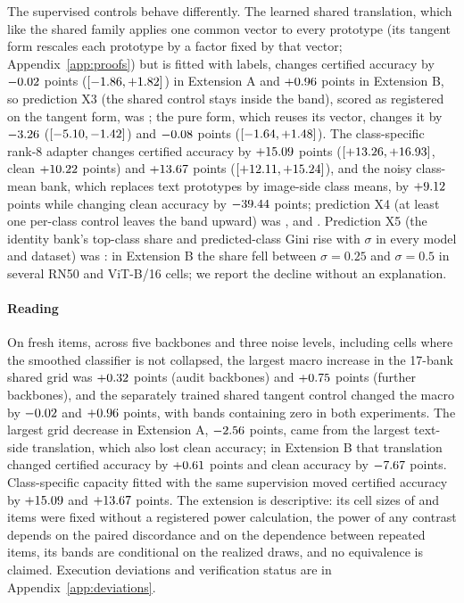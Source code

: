 The supervised controls behave differently. The learned shared translation,
which like the shared family applies one common vector to every prototype
(its tangent form rescales each prototype by a factor fixed by that vector;
Appendix~\ref{app:proofs}) but is fitted with labels, changes certified
accuracy by $-0.02$ points
($[-1.86,+1.82]$) in Extension A and
$+0.96$ points in Extension B, so prediction X3 (the shared
control stays inside the band), scored as registered on the tangent form, was
\ExtXthreeSummary{}; the pure form, which reuses its vector, changes it by $-3.26$
($[-5.10,-1.42]$) and $-0.08$
points ($[-1.64,+1.48]$). The
class-specific rank-8 adapter changes certified accuracy by
$+15.09$ points ($[+13.26,+16.93]$, clean
$+10.22$ points) and $+13.67$ points
($[+12.11,+15.24]$), and the noisy class-mean bank,
which replaces text prototypes by image-side class means, by
$+9.12$ points while changing clean accuracy by
$-39.44$ points; prediction X4 (at least one per-class
control leaves the band upward) was \ExtXfourSummary{}, and \ExtXfourFlags{}.
Prediction X5 (the identity bank's
top-class share and predicted-class Gini rise with $\sigma$ in every model and
dataset) was \ExtXfiveSummary{}: in Extension B the share fell between
$\sigma=0.25$ and $\sigma=0.5$ in several RN50 and ViT-B/16 cells; we report the
decline without an explanation.

\paragraph{Reading}
On fresh items, across five backbones and three noise levels, including cells
where the smoothed classifier is not collapsed, the largest macro increase in
the 17-bank shared grid was $+0.32$ points (audit backbones) and
$+0.75$ points (further backbones), and the separately trained
shared tangent control changed the macro by
$-0.02$ and $+0.96$ points, with bands
containing zero in both experiments. The largest grid decrease in Extension A,
$-2.56$ points, came from the largest text-side translation, which
also lost clean accuracy; in Extension B that translation changed certified
accuracy by $+0.61$ points and clean accuracy by
$-7.67$ points. Class-specific
capacity fitted with the same supervision moved certified accuracy by
$+15.09$ and $+13.67$ points. The extension is descriptive:
its cell sizes of \ExtItemsCifar{} and \ExtItemsEurosat{} items were fixed
without a registered power calculation, the power of any contrast depends on
the paired discordance and on the dependence between repeated items, its bands
are conditional on the realized draws, and no equivalence is claimed.
Execution deviations and verification status are in
Appendix~\ref{app:deviations}.

